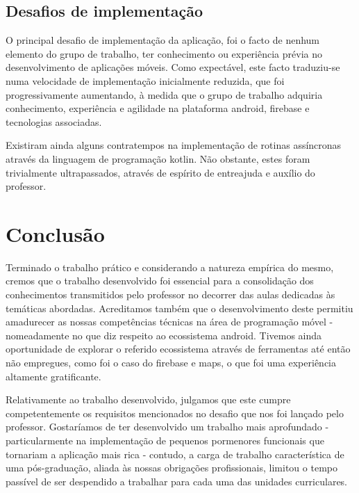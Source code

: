 \documentclass[12pt]{report}
\begin{document}
\clearpage

\section{Desafios de implementação}

O principal desafio de implementação da aplicação, foi o facto de nenhum elemento do grupo de trabalho, ter  conhecimento ou experiência prévia no desenvolvimento de aplicações móveis. Como expectável, este facto traduziu-se numa velocidade de implementação inicialmente reduzida, que foi progressivamente aumentando, à medida que o grupo de trabalho adquiria conhecimento, experiência e agilidade na plataforma \gls{android}, \gls{firebase} e tecnologias associadas.

Existiram ainda alguns contratempos na implementação de rotinas assíncronas através da linguagem de programação \gls{kotlin}. Não obstante, estes foram trivialmente ultrapassados, através de espírito de entreajuda e auxílio do professor.

\chapter{Conclusão}

Terminado o trabalho prático e considerando a natureza empírica do mesmo, cremos que o trabalho desenvolvido foi essencial para a consolidação dos conhecimentos transmitidos pelo professor no decorrer das aulas dedicadas às temáticas abordadas. Acreditamos também que o desenvolvimento deste permitiu amadurecer as nossas competências técnicas na área de programação móvel - nomeadamente no que diz respeito ao ecossistema \gls{android}. Tivemos ainda oportunidade de explorar o referido ecossistema através de ferramentas até então não empregues, como foi o caso do \gls{firebase} e \gls{maps}, o que foi uma experiência altamente gratificante.

Relativamente ao trabalho desenvolvido, julgamos que este cumpre competentemente os requisitos mencionados no desafio que nos foi lançado pelo professor. Gostaríamos de ter desenvolvido um trabalho mais aprofundado - particularmente na implementação de pequenos pormenores funcionais que tornariam a aplicação mais rica - contudo, a carga de trabalho característica de uma pós-graduação, aliada às nossas obrigações profissionais, limitou o tempo passível de ser despendido a trabalhar para cada uma das unidades curriculares.



\nocite{*}
\end{document}
